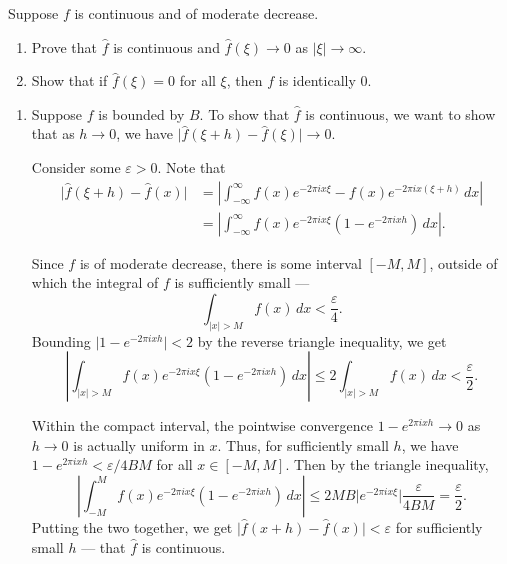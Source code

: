 \documentclass[12 pt, letterpaper]{hmcpset}
\begin{document}
\pagebreak

\begin{problem}[S \& S \S 5.5 \#5]
	Suppose $f$ is continuous and of moderate decrease.
	\begin{enumerate}
		\item Prove that $\hat{f}$ is continuous and $\hat{f}(\xi) \to 0$ as $\lvert \xi \rvert \to \infty$.
		\item Show that if $\hat{f}(\xi) = 0$ for all $\xi$, then $f$ is identically $0$.
	\end{enumerate}
\end{problem}

\begin{solution}
	\begin{enumerate}
		\item Suppose $f$ is bounded by $B$. To show that $\hat{f}$ is continuous, we want to show that as $h \to 0$, we have $\lvert \hat{f}(\xi + h) - \hat{f}(\xi) \rvert \to 0$. 

			Consider some $\varepsilon > 0$. Note that
			\begin{align*}
				\lvert \hat{f}(\xi + h) - \hat{f}(x) \rvert & = \left \lvert \int_{-\infty}^{\infty} f(x) e^{- 2 \pi i x \xi} - f(x) e^{-2 \pi i x (\xi + h)} \, dx \right \rvert \\
									    & = \left \lvert \int_{-\infty}^{\infty} f(x) e^{-2 \pi i x \xi} (1 - e^{-2 \pi i x h}) \, dx  \right \rvert.
			\end{align*}

			Since $f$ is of moderate decrease, there is some interval $[-M, M]$, outside of which the integral of $f$ is sufficiently small ---
			\[
				\int_{\lvert x \rvert > M} f(x) \, dx < \frac{\varepsilon}{4}.
			\]
			Bounding $\lvert 1 - e^{-2 \pi i x h} \rvert < 2$ by the reverse triangle inequality, we get
			\[
				\left \lvert \int_{\lvert x \rvert > M} f(x) e^{-2 \pi i x \xi} (1 - e^{-2 \pi i x h}) \, dx  \right \rvert \le 2 \int_{\lvert x \rvert > M} f(x) \, dx < \frac{\varepsilon}{2}.
			\]

			Within the compact interval, the pointwise convergence $1 - e^{2 \pi i x h} \to 0$ as $h \to 0$ is actually uniform in $x$. Thus, for sufficiently small $h$, we have $1 - e^{2 \pi i x h} < \varepsilon / 4 B M$ for all $x \in [-M, M]$. Then by the triangle inequality,
			\[
				\left \lvert \int_{-M}^{M} f(x) e^{-2 \pi i x \xi} (1 - e^{-2 \pi i x h}) \, dx  \right \rvert \le 2 M B \lvert e^{- 2 \pi i x \xi} \rvert \frac{\varepsilon}{4 B M} = \frac{\varepsilon}{2}.
			\]
			Putting the two together, we get $\lvert \hat{f}(x + h) - \hat{f}(x) \rvert < \varepsilon$ for sufficiently small $h$ --- that $\hat{f}$ is continuous.


\end{enumerate}
\end{solution}
\end{document}
